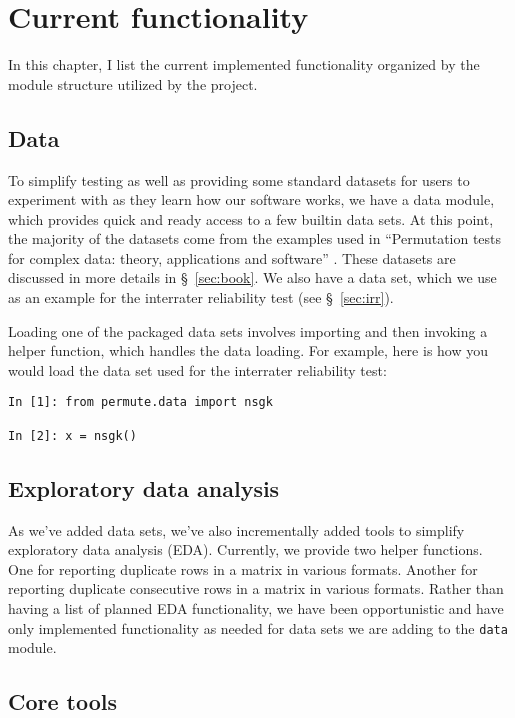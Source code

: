 \chapter{Current functionality}

In this chapter, I list the current implemented functionality organized
by the module structure utilized by the project. 

\section{Data}

To simplify testing as well as providing some standard datasets for
users to experiment with as they learn how our software works, we
have a data module, which provides quick and ready access to a few
builtin data sets. At this point, the majority of the datasets come
from the examples used in ``Permutation tests for complex data: theory,
applications and software'' \cite{pesarin2010permutation}.  These
datasets are discussed in more details in §~\ref{sec:book}.  We also
have a data set, which we use as an example for the interrater
reliability test (see  §~\ref{sec:irr}).

Loading one of the packaged data sets involves importing and then
invoking a helper function, which handles the data loading.  For
example, here is how you would load the data set used for the
interrater reliability test:
\begin{verbatim}
In [1]: from permute.data import nsgk

In [2]: x = nsgk()
\end{verbatim} 

\section{Exploratory data analysis}

As we've added data sets, we've also incrementally added tools to simplify
exploratory data analysis (EDA).  Currently, we provide two helper functions.
One for reporting duplicate rows in a matrix in various formats.  Another for
reporting duplicate consecutive rows in a matrix in various formats.  Rather
than having a list of planned EDA functionality, we have been opportunistic
and have only implemented functionality as needed for data sets we are adding
to the \texttt{data} module.

\section{Core tools}

